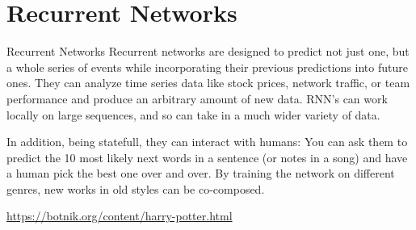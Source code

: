 \documentclass[10pt, table, dvipsnames,xcdraw, handout]{beamer}
\begin{document}
\section{Recurrent Networks}

\begin{frame}[fragile]{Recurrent Networks}
Recurrent networks are designed to predict not just one, but a whole series of events while incorporating their previous predictions into future ones. They can analyze time series data like stock prices, network traffic, or team performance and produce an arbitrary amount of new data. RNN's can work locally on large sequences, and so can take in a much wider variety of data. \pause\newline

In addition, being statefull, they can interact with humans: You can ask them to predict the 10 most likely next words in a sentence (or notes in a song) and have a human pick the best one over and over. By training the network on different genres, new works in old styles can be co-composed. 

\url{https://botnik.org/content/harry-potter.html}
\end{frame}
\end{document}

